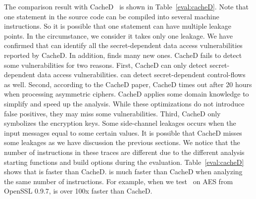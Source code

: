 The comparison result with CacheD~\cite{203878,217537} is shown in Table~\ref{eval:cacheD}.
Note that one statement in the source code can be compiled into several machine instructions. So it is possible that one statement can have multiple leakage points. In the circumstance, we consider it takes only one leakage.
We have confirmed that \detect{} can identify all the secret-dependent data access vulnerabilities reported by CacheD. In addition, \detect{} finds many new ones.
CacheD fails to detect some vulnerabilities for two
reasons. First, CacheD can only detect secret-dependent data access
vulnerabilities. \detect{} can detect secret-dependent control-flows as well.
Second, according to the CacheD paper, CacheD times out after 20 hours when processing
asymmetric ciphers. CacheD applies some domain knowledge to simplify and speed up
the analysis.
While these optimizations do not introduce false positives, they may miss some
vulnerabilities.
Third, CacheD only symbolizes the encryption keys. Some side-channel leakages occurs when the input messages equal to some certain values. It is possible that CacheD misses some
leakages as we have discussion the previous sections.
We notice that the number of instructions in these traces are different due to the different analysis starting functions and build options during the evaluation.
Table~\ref{eval:cacheD} shows that
\detect{} is faster than CacheD. \detect{} is much faster than CacheD when analyzing the same
number of instructions. For example, when we test~\detect{} on AES from OpenSSL
0.9.7, \detect{} is over 100x faster than CacheD.
